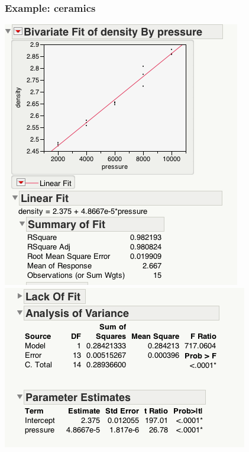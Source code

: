 \documentclass[handout]{beamer}\usepackage[]{graphicx}\usepackage[]{color}
\numberwithin{equation}{section}
\begin{document}
\begin{frame}
\frametitle{Example: ceramics}
\begin{center}
 \includegraphics{../../fig/jmpcer1.png}
 \includegraphics{../../fig/jmpcer2.png}
\end{center}
\end{frame}
\end{document}
